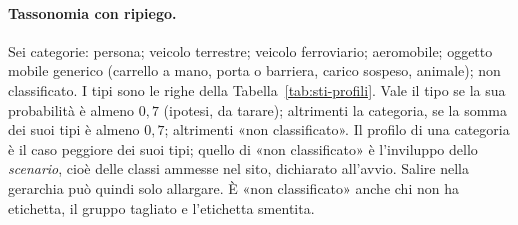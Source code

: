 \paragraph{Tassonomia con ripiego.} Sei categorie: persona; veicolo terrestre; veicolo ferroviario; aeromobile; oggetto mobile generico (carrello a mano, porta o barriera, carico sospeso, animale); non classificato. I tipi sono le righe della Tabella~\ref{tab:sti-profili}. Vale il tipo se la sua probabilità è almeno $0{,}7$ (ipotesi, da tarare); altrimenti la categoria, se la somma dei suoi tipi è almeno $0{,}7$; altrimenti «non classificato». Il profilo di una categoria è il caso peggiore dei suoi tipi; quello di «non classificato» è l'inviluppo dello \emph{scenario}, cioè delle classi ammesse nel sito, dichiarato all'avvio. Salire nella gerarchia può quindi solo allargare. È «non classificato» anche chi non ha etichetta, il gruppo tagliato e l'etichetta smentita.

